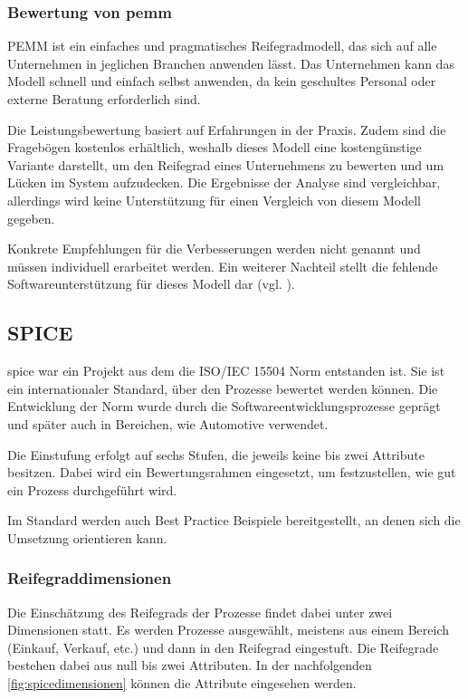 \subsubsection{Bewertung von \acs{pemm}}

PEMM ist ein einfaches und pragmatisches Reifegradmodell, das sich auf alle Unternehmen in jeglichen Branchen anwenden lässt. Das Unternehmen kann das Modell schnell und einfach selbst anwenden, da kein geschultes Personal oder externe Beratung erforderlich sind. \par Die Leistungsbewertung basiert auf Erfahrungen in der Praxis. Zudem sind die Fragebögen kostenlos erhältlich, weshalb dieses Modell eine kostengünstige Variante darstellt, um den Reifegrad eines Unternehmens zu bewerten und um Lücken im System aufzudecken. Die Ergebnisse der Analyse sind vergleichbar, allerdings wird keine Unterstützung für einen Vergleich von diesem Modell gegeben.\par Konkrete Empfehlungen für die Verbesserungen werden nicht genannt und müssen individuell erarbeitet werden. Ein weiterer Nachteil stellt die fehlende Softwareunterstützung für dieses Modell dar (vgl. \cite[S.44]{Bensiek2013}).

\subsection{SPICE}

\ac{spice} war ein Projekt aus dem die ISO/IEC 15504 Norm entstanden ist. Sie ist ein internationaler Standard, über den Prozesse bewertet werden können.
Die Entwicklung der Norm wurde durch die Softwareentwicklungsprozesse geprägt und später auch in Bereichen, wie Automotive verwendet.\par
Die Einstufung erfolgt auf sechs Stufen, die jeweils keine bis zwei Attribute besitzen. Dabei wird ein Bewertungsrahmen eingesetzt, um festzustellen, wie gut ein Prozess durchgeführt wird.\par
Im Standard werden auch Best Practice Beispiele bereitgestellt, an denen sich die Umsetzung orientieren kann.

\subsubsection{Reifegraddimensionen}

Die Einschätzung des Reifegrads der Prozesse findet dabei unter zwei Dimensionen statt. Es werden Prozesse ausgewählt, meistens aus einem Bereich (Einkauf, Verkauf, etc.) und dann in den Reifegrad eingestuft. Die Reifegrade bestehen dabei aus null bis zwei Attributen. In der nachfolgenden \autoref{fig:spicedimensionen} können die Attribute eingesehen werden.

